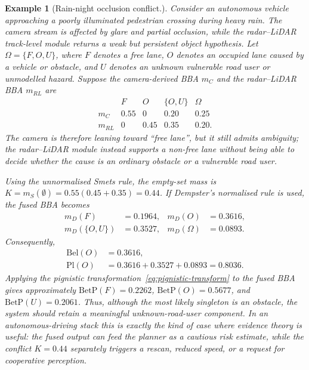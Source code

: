 \documentclass{ieeeaccess}
\newtheorem{example}{Example}
\begin{document}
\begin{example}[Rain-night occlusion conflict.]
Consider an autonomous vehicle approaching a poorly illuminated pedestrian crossing during heavy rain. The camera stream is affected by glare and partial occlusion, while the radar--LiDAR track-level module returns a weak but persistent object hypothesis. Let
\(\Omega=\{F,O,U\}\), where \(F\) denotes a free lane, \(O\) denotes an occupied lane caused by a vehicle or obstacle, and \(U\) denotes an unknown vulnerable road user or unmodelled hazard. Suppose the camera-derived BBA \(m_C\) and the radar--LiDAR BBA \(m_{RL}\) are
\begin{equation}
\begin{array}{c|cccc}
 & F & O & \{O,U\} & \Omega \\
\hline
m_C & 0.55 & 0 & 0.20 & 0.25 \\
m_{RL} & 0 & 0.45 & 0.35 & 0.20 .
\end{array}
\label{eq:evidence-example-bbas}
\end{equation}
The camera is therefore leaning toward ``free lane'', but it still admits ambiguity; the radar--LiDAR module instead supports a non-free lane without being able to decide whether the cause is an ordinary obstacle or a vulnerable road user.

Using the unnormalised Smets rule, the empty-set mass is
\(K=m_S(\emptyset)=0.55(0.45+0.35)=0.44\). If Dempster's normalised rule is used, the fused BBA becomes
\begin{equation}
\begin{aligned}
m_D(F)&=0.1964, &
m_D(O)&=0.3616,\\
m_D(\{O,U\})&=0.3527, &
m_D(\Omega)&=0.0893 .
\end{aligned}
\end{equation}
Consequently,
\begin{equation}
\begin{aligned}
\mathrm{Bel}(O)&=0.3616,\\
\mathrm{Pl}(O)&=0.3616+0.3527+0.0893=0.8036 .
\end{aligned}
\end{equation}
Applying the pignistic transformation~\eqref{eq:pignistic-transform} to the fused BBA gives approximately \(\mathrm{BetP}(F)=0.2262\), \(\mathrm{BetP}(O)=0.5677\), and \(\mathrm{BetP}(U)=0.2061\). Thus, although the most likely singleton is an obstacle, the system should retain a meaningful unknown-road-user component. In an autonomous-driving stack this is exactly the kind of case where evidence theory is useful: the fused output can feed the planner as a cautious risk estimate, while the conflict \(K=0.44\) separately triggers a rescan, reduced speed, or a request for cooperative perception. 
\end{example}
\end{document}
